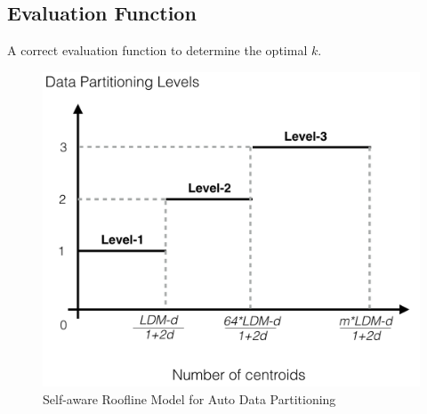 \documentclass[10pt,journal,compsoc]{IEEEtran}
\begin{document}
{%




    

\subsection{Evaluation Function}
A correct evaluation function to determine the optimal $k$.



\begin{figure}
\centering
\includegraphics[scale=0.45]{roofline.png}
\caption{Self-aware Roofline Model for Auto Data Partitioning}
\label{roofline}
\end{figure}

}
\end{document}
